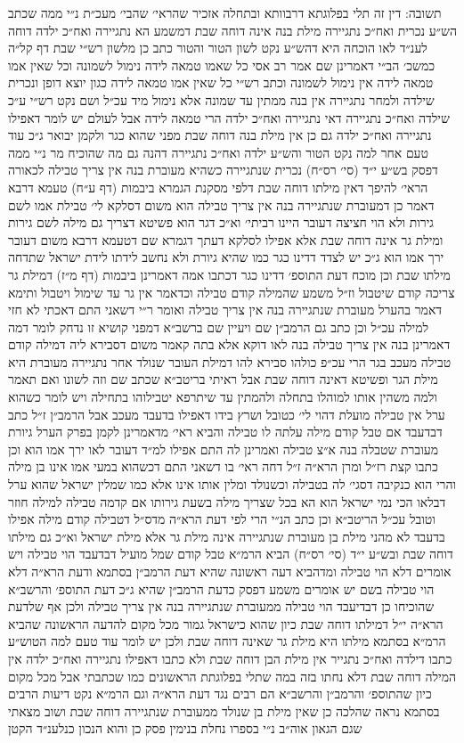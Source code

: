 \documentclass[12pt, openany]{book}
\begin{document}
\begin{multicols}{2}
תשובה: דין זה תלי בפלוגתא דרבוותא ובתחלה אזכיר שהראי׳ שהבי׳ מעכ״ת נ״י ממה שכתב הש״ע נכרית ואח״כ נתגיירה מילת בנה אינה דוחה שבת דמשמע הא נתגיירה ואח״כ ילדה דוחה לענ״ד לאו הוכחה היא דהש״ע נקט לשון הטור והטור כתב כן מלשון רש״י שבת דף קל״ה כמשכ׳ הב״י דאמרינן שם אמר רב אסי כל שאמו טמאה לידה נימול לשמונה וכל שאין אמו טמאה לידה אין נימול לשמונה וכתב רש״י כל שאין אמו טמאה לידה כגון יוצא דופן ונכרית שילדה ולמחר נתגיירה אין בנה ממתין עד שמונה אלא נימול מיד עכ״ל ושם נקט רש״י ע״כ שילדה ואח״כ נתגיירה דאי נתגיירה ואח״כ ילדה הרי טמאה לידה אבל לעולם יש לומר דאפילו נתגיירה ואח״כ ילדה גם כן אין מילת בנה דוחה שבת מפני שהוא כגר ולקמן יבואר ג״כ עוד טעם אחר למה נקט הטור והש״ע ילדה ואח״כ נתגיירה דהנה גם מה שהוכיח מר נ״י ממה דפסק בש״ע י״ד (סי׳ רס״ח) נכרית שנתגיירה כשהיא מעוברת בנה אין צריך טבילה לכאורה הראי׳ להיפך דאין מילתו דוחה שבת דלפי מסקנת הגמרא ביבמות (דף ע״ח) טעמא דרבא דאמר כן דמעוברת שנתגיירה בנה אין צריך טבילה הוא משום דסלקא לי׳ טבילת אמו לשם גירות ולא הוי חציצה דעובר היינו רביתי׳ וא״כ דגר הוא פשיטא דצריך גם מילה לשם גירות ומילת גר אינה דוחה שבת אלא אפילו לסלקא דעתך דגמרא שם דטעמא דרבא משום דעובר ירך אמו הוא ג״כ יש לצדד דדינו כגר כמו שהיא גיורת ולא נחשב לידתו לידת ישראל שתדחה מילתו שבת וכן מוכח דעת התוספ׳ דדינו כגר דכתבו אמה דאמרינן ביבמות (דף מ״ז) דמילת גר צריכה קודם שיטבול וז״ל משמע שהמילה קודם טבילה וכדאמר אין גר עד שימול ויטבול ותימא דאמר בהערל מעוברת שנתגיירה בנה אין צריך טבילה ואומר ר״י דשאני התם דאכתי לא חזי למילה עכ״ל וכן כתב גם הרמב״ן שם ויעיין שם ברשב״א דמפני קושיא זו נדחק לומר דמה דאמרינן בנה אין צריך טבילה בנה לאו דוקא אלא בתה קאמר משום דסבירא ליה דמילה קודם טבילה מעכב בגר הרי עכ״פ כולהו סבירא להו דמילת העובר שנולד אחר נתגיירה מעוברת היא מילת הגר ופשיטא דאינה דוחה שבת אבל ראיתי בריטב״א שכתב שם וזה לשונו ואם תאמר ולמה משהין אותו למוהלו בתחלה ולהמתין עד שיתרפא יטבילוהו בתחילה ויש לומר כשהוא ערל אין טבילה מועלת דהוי לי׳ כטובל ושרץ בידו דאפילו בדעבד מעכב אבל הרמב״ן ז״ל כתב דבדעבד אם טבל קודם מילה עלתה לו טבילה והביא ראי׳ מדאמרינן לקמן בפרק הערל גיורת מעוברת שטבלה בנה א״צ טבילה ואמרינן לה התם אפילו למ״ד דעובר לאו ירך אמו הוא וכן כתבו קצת רז״ל ומרן הרא״ה ז״ל דחה ראי׳ בו דשאני התם דכשהוא במעי אמו אינו בן מילה והרי הוא כנקיבה דסגי׳ לה בטבילה וכשנולד ומלין אותו אינו אלא כמו שמלין ישראל שהוא ערל דבלאו הכי נמי ישראל הוא הא בכל שצריך מילה בשעת גירותו אם קדמה טבילה למילה חוזר וטובל עכ״ל הריטב״א וכן כתב הנ״י הרי לפי דעת הרא״ה מדס״ל דטבילה קודם מילה אפילו בדעבד לא מהני מילת בן מעוברת שנתגיירה אינה מילת גר אלא מילת ישראל וא״כ גם מילתו דוחה שבת ובש״ע י״ד (סי׳ רס״ח) הביא הרמ״א טבל קודם שמל מועיל דבדעבד הוי טבילה ויש אומרים דלא הוי טבילה ומדהביא דעה ראשונה שהיא דעת הרמב״ן בסתמא ודעת הרא״ה דלא הוי טבילה בשם יש אומרים משמע דפסק כדעת הרמב״ן שהיא ג״כ דעת התוספ׳ והרשב״א שהוכיחו כן דבדיעבד הוי טבילה ממעוברת שנתגיירה בנה אין צריך טבילה ולכן אף שלדעת הרא״ה י״ל דמילתו דוחה שבת כיון שהוא כישראל גמור מכל מקום להדעה הראשונה שהביא הרמ״א בסתמא מילתו היא מילת גר שאינה דוחה שבת ולכן יש לומר עוד טעם למה הטוש״ע כתבו דילדה ואח״כ נתגייר אין מילת הבן דוחה שבת ולא כתבו דאפילו נתגיירה ואח״כ ילדה אין המילה דוחה שבת דלא נחתו בזה במה שתלי בפלוגתת הראשונים כמו שכתבתי אבל מכל מקום כיון שהתוספ׳ והרמב״ן והרשב״א הם רבים נגד דעת הרא״ה וגם הרמ״א נקט דיעות הרבים בסתמא נראה שהלכה כן שאין מילת בן שנולד ממעוברת שנתגיירה דוחה שבת ושוב מצאתי שגם הגאון אוה״ב נ״י בספרו נחלת בנימין פסק כן והוא הנכון כנלענ״ד הקטן 
\end{multicols}
\end{document}
